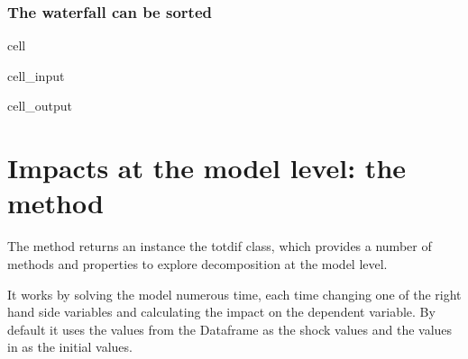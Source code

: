 \documentclass[letterpaper,10pt,english]{jupyterBook}
\begin{document}
\subsubsection{The waterfall can be sorted}
\label{\detokenize{content/06_ModelAnalytics/Attribution:the-waterfall-can-be-sorted}}
\begin{sphinxuseclass}{cell}\begin{sphinxVerbatimInput}

\begin{sphinxuseclass}{cell_input}
\begin{sphinxVerbatim}[commandchars=\\\{\}]
  
\end{sphinxVerbatim}

\end{sphinxuseclass}\end{sphinxVerbatimInput}
\begin{sphinxVerbatimOutput}

\begin{sphinxuseclass}{cell_output}
\noindent{}

\end{sphinxuseclass}\end{sphinxVerbatimOutput}

\end{sphinxuseclass}

\section{Impacts at the model level: the  method}
\label{\detokenize{content/06_ModelAnalytics/Attribution:impacts-at-the-model-level-the-totdif-method}}
\sphinxAtStartPar
The method  returns an instance  the totdif class, which provides a number of methods and properties to explore decomposition at the model level.

\sphinxAtStartPar
It works by solving the model numerous time, each time changing one of the right hand side variables and calculating the impact on the dependent variable. By default it uses the values from the  Dataframe as the shock values and the values in  as the initial values.
\end{document}
